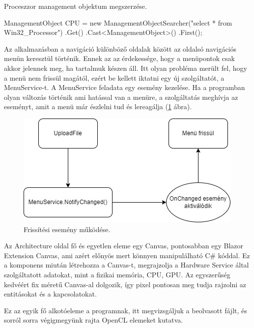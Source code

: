 Proceszzor management objektum megszerzése.
\begin{cpp}
ManagementObject CPU = 
	new ManagementObjectSearcher("select * from Win32_Processor")
            .Get()
            .Cast<ManagementObject>()
            .First();
\end{cpp}
\newpage

Az alkalmazásban a navigáció különböző oldalak között az oldalsó navigációs menün keresztül történik. Ennek az az érdekessége, hogy a menüpontok csak akkor jelennek meg, ha tartalmuk készen áll. Itt olyan probléma merült fel, hogy a menü nem frissül magától, ezért be kellett iktatni egy új szolgáltatót, a MenuService-t. A MenuService feladata egy esemény kezelése. Ha a programban olyan változás történik ami hatással van a menüre, a szolgáltatás meghívja az eseményt, amit a menü már észlelni tud és lereagálja (\ref{fig:MenuEvent} ábra). 

\begin{figure}[h]
\centering
\includegraphics[scale=0.5]{images/MenuS.jpg}
\caption{Frissítési esemény működése.}
\label{fig:MenuEvent}
\end{figure}

Az Architecture oldal fő és egyetlen eleme egy Canvas, pontosabban egy Blazor Extension Canvas, ami azért előnyös mert könnyen manipulálható C\# kóddal. Ez a komponens miután létrehozza a Canvas-t, megrajzolja a Hardware Service által szolgáltatott adatokat, mint a fizikai memória, CPU, GPU. Az egyszerűség kedvéért fix méretű Canvas-al dolgozik, így pixel pontosan meg tudja rajzolni az entitásokat és a kapcsolatokat.

Ez az egyik fő alkotóeleme a programnak, itt megvizsgáljuk a beolvasott fájlt, és sorról sorra végigmegyünk rajta OpenCL elemeket kutatva. 

